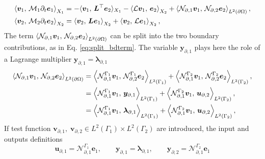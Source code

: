 \begin{equation}\label{eq:pHlinsys_mixed_weak}
\begin{aligned}
\inner[X_1]{\bm{v}_1}{\mathcal{M}_1 \partial_t \bm{e}_1} &=   -  \langle{\bm{v}_1}, \,{\bm{L}^\top \bm{e}_2}\rangle_{X_1}  -\inner[X_2]{\mathcal{L}\bm{v}_1}{\bm{e}_2} + \inner[L^2({\partial\Omega})]{\mathcal{N}_{\partial, 1} \bm{v}_1}{\mathcal{N}_{\partial, 2}\bm{e}_2}, \\
\inner[X_2]{\bm{v}_2}{\mathcal{M}_2 \partial_t \bm{e}_2} &=   \inner[X_2]{\bm{v}_2}{\bm{L}\bm{e}_1} + \inner[X_2]{\bm{v}_2}{\mathcal{L}\bm{e}_1}, \\
\end{aligned}
\end{equation}
The term $\inner[L^2({\partial\Omega})]{\mathcal{N}_{\partial, 1} \bm{v}_1}{\mathcal{N}_{\partial, 2}\bm{e}_2}$ can be split into the two boundary contributions, as in Eq. \eqref{eq:split_bdterm}. The variable  $\bm{y}_{\partial, 1}$ plays here the role of a Lagrange multiplier $\bm{y}_{\partial, 1}=\bm{\lambda}_{\partial, 1}$
\begin{equation}\label{eq:bdterm_mixed}
\begin{aligned}
\inner[L^2({\partial\Omega})]{\mathcal{N}_{\partial, 1} \bm{v}_1}{\mathcal{N}_{\partial, 2}\bm{e}_2} &= \inner[L^2(\Gamma_1)]{\mathcal{N}_{\partial, 1}^{\Gamma_1}\bm{v}_1}{\mathcal{N}_{\partial, 2}^{\Gamma_1}\bm{e}_2} + \inner[L^2(\Gamma_2)]{\mathcal{N}_{\partial, 1}^{\Gamma_2}\bm{v}_1}{\mathcal{N}_{\partial, 2}^{\Gamma_2}\bm{e}_2}, \\
&= \inner[L^2(\Gamma_1)]{\mathcal{N}_{\partial, 1}^{\Gamma_1}\bm{v}_1}{\bm{y}_{\partial, 1}} + \inner[L^2(\Gamma_2)]{\mathcal{N}_{\partial, 1}^{\Gamma_2}\bm{v}_1}{\bm{u}_{\partial, 2}}, \\
&= \inner[L^2(\Gamma_1)]{\mathcal{N}_{\partial, 1}^{\Gamma_1}\bm{v}_1}{\bm{\lambda}_{\partial, 1}} + \inner[L^2(\Gamma_2)]{\mathcal{N}_{\partial, 1}^{\Gamma_2}\bm{v}_1}{\bm{u}_{\partial, 2}}, \\
\end{aligned}
\end{equation}
If test function $\bm{v}_{\partial, 1}, \; \bm{v}_{\partial, 2} \in L^2(\Gamma_1) \times L^2(\Gamma_2)$ are introduced, the input and outputs definitions
\begin{equation}
\bm{u}_{\partial, 1}=\mathcal{N}_{\partial, 1}^{\Gamma_1}\bm{e}_{1}, \qquad \bm{y}_{\partial, 1}=\bm{\lambda}_{\partial, 1}, \qquad \bm{y}_{\partial, 2}=\mathcal{N}_{\partial, 1}^{\Gamma_2}\bm{e}_{1}
\end{equation}  
